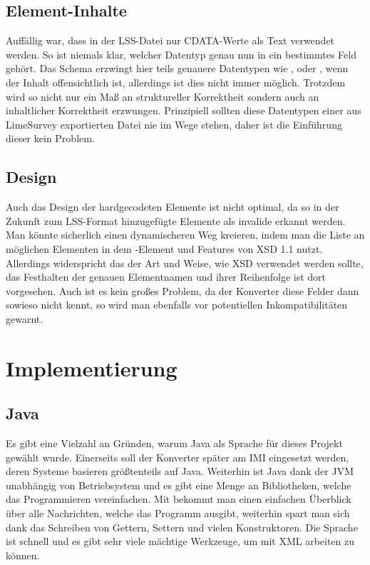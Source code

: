 \subsection{Element-Inhalte}

Auffällig war, dass in der LSS-Datei nur CDATA-Werte als Text verwendet werden.
So ist niemals klar, welcher Datentyp genau nun in ein bestimmtes Feld gehört.
Das Schema erzwingt hier teils genauere Datentypen wie ,  oder , wenn der Inhalt offensichtlich ist, allerdings ist dies nicht immer möglich.
Trotzdem wird so nicht nur ein Maß an struktureller Korrektheit sondern auch an inhaltlicher Korrektheit erzwungen.
Prinzipiell sollten diese Datentypen einer aus LimeSurvey exportierten Datei nie im Wege stehen, daher ist die Einführung dieser kein Problem.

\subsection{Design}

Auch das Design der hardgecodeten Elemente ist nicht optimal, da so in der Zukunft zum LSS-Format hinzugefügte Elemente als invalide erkannt werden.
Man könnte sicherlich einen dynamischeren Weg kreieren, indem man die Liste an möglichen Elementen in dem -Element und Features von XSD 1.1 nutzt.
Allerdings widerspricht das der Art und Weise, wie XSD verwendet werden sollte, das Festhalten der genauen Elementnamen und ihrer Reihenfolge ist dort vorgesehen.
Auch ist es kein großes Problem, da der Konverter diese Felder dann sowieso nicht kennt, so wird man ebenfalls vor potentiellen Inkompatibilitäten gewarnt.

\section{Implementierung}

\subsection{Java}

Es gibt eine Vielzahl an Gründen, warum Java als Sprache für dieses Projekt gewählt wurde.
Einerseits soll der Konverter später am IMI eingesetzt werden, deren Systeme basieren größtenteils auf Java.
Weiterhin ist Java dank der JVM unabhängig von Betriebsystem und es gibt eine Menge an Bibliotheken, welche das Programmieren vereinfachen.
Mit  bekommt man einen einfachen Überblick über alle Nachrichten, welche das Programm ausgibt, weiterhin spart man sich dank  das Schreiben von Gettern, Settern und vielen Konstruktoren.
Die Sprache ist schnell und es gibt sehr viele mächtige Werkzeuge, um mit XML arbeiten zu können.

